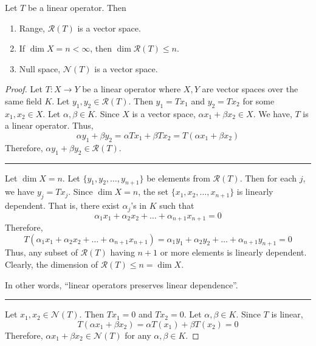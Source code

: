 \begin{theorem}
	Let $T$ be a linear operator. Then
	\begin{enumerate}
		\item Range, $\mathscr{R}(T)$ is a vector space.
		\item If $\dim X = n < \infty$, then $\dim \mathscr{R}(T) \le n$.
		\item Null space, $\mathscr{N}(T)$ is a vector space.
	\end{enumerate}
\end{theorem}
\begin{proof}
	Let $T : X \to Y$ be a linear operator where $X,Y$ are vector spaces over the same field $K$.
	Let $y_1,y_2 \in \mathscr{R}(T)$.
	Then $y_1 = Tx_1$ and $y_2 = Tx_2$ for some $x_1,x_2 \in X$.
	Let $\alpha,\beta \in K$.
	Since $X$ is a vector space, $\alpha x_1 + \beta x_2 \in X$.
	We have, $T$ is a linear operator. Thus,
	\[ \alpha y_1 + \beta y_2 = \alpha Tx_1 + \beta Tx_2 = T(\alpha x_1 + \beta x_2) \]
	Therefore, $\alpha y_1 + \beta y_2 \in \mathscr{R}(T)$.\\

	\hrule \vspace{1em}

	Let $\dim X = n$.
	Let $\{ y_1,y_2,\dots,y_{n+1}\}$ be elements from $\mathscr{R}(T)$.
	Then for each $j$, we have $y_j = Tx_j$.
	Since $\dim X = n$, the set $\{x_1,x_2,\dots,x_{n+1}\}$ is linearly dependent.
	That is, there exist $\alpha_j$'s in $K$ such that 
	\[ \alpha_1 x_1 + \alpha_2 x_2 + \dots + \alpha_{n+1} x_{n+1} = 0 \]
	Therefore,
	\[ T(\alpha_1 x_1 + \alpha_2 x_2 + \dots + \alpha_{n+1} x_{n+1}) = \alpha_1 y_1 + \alpha_2 y_2 + \dots + \alpha_{n+1} y_{n+1} = 0 \]
	Thus, any subset of $\mathscr{R}(T)$ having $n+1$ or more elements is linearly dependent.
	Clearly, the dimension of $\mathscr{R}(T) \le n = \dim X$.\\
	\begin{important}
		In other words, ``linear operators preserves linear dependence''.
	\end{important}

	\hrule \vspace{1em}

	Let $x_1,x_2 \in \mathscr{N}(T)$.
	Then $Tx_1 = 0$ and $Tx_2 = 0$.
	Let $\alpha, \beta \in K$.
	Since $T$ is linear,
	\[ T(\alpha x_1 +\beta x_2) = \alpha T(x_1) + \beta T(x_2) = 0 \]
	Therefore, $\alpha x_1 + \beta x_2 \in \mathscr{N}(T)$ for any $\alpha, \beta \in K$.
\end{proof}
